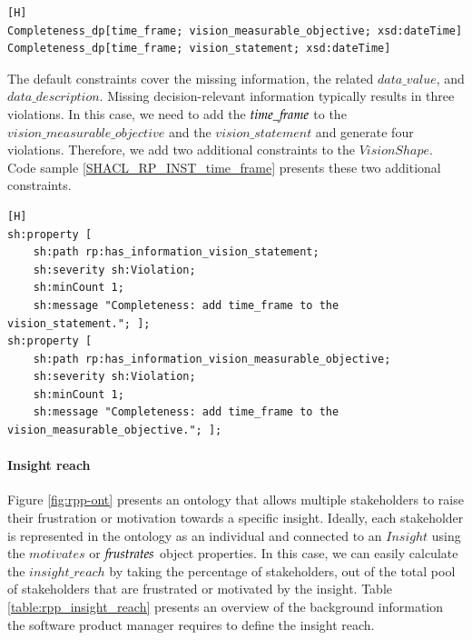 \begin{lstlisting}[float,language=GDOL,caption={The GDOL instantiation code of the time frames of the $vision\_measurable\_objective$ and the $vision\_statement$.},label={GDOP_RP_INST_Vision_Contribution_Time_Frame}][H]
Completeness_dp[time_frame; vision_measurable_objective; xsd:dateTime] 
Completeness_dp[time_frame; vision_statement; xsd:dateTime] 
\end{lstlisting}

The default constraints cover the missing information, the related $data\_value$, and $data\_description$. Missing decision-relevant information typically results in three violations. In this case, we need to add the $time\_{\mkern-2mu f\mkern-3mu}rame$ to the $vision\_measurable\_objective$ and the $vision\_statement$ and generate four violations. Therefore, we add two additional constraints to the $VisionShape$. Code sample \ref{SHACL_RP_INST_time_frame} presents these two additional constraints.

\begin{lstlisting}[float,language=SHACL,caption={The SHACL shapes that validate the completeness of the $time\_{\f}rame$ data property in the context of the vision statement and the measurable objective.},label={SHACL_RP_INST_time_frame}][H]
sh:property [
	sh:path rp:has_information_vision_statement;
	sh:severity sh:Violation; 
	sh:minCount 1; 
	sh:message "Completeness: add time_frame to the vision_statement."; ];
sh:property [
	sh:path rp:has_information_vision_measurable_objective;
	sh:severity sh:Violation; 
	sh:minCount 1; 
	sh:message "Completeness: add time_frame to the vision_measurable_objective."; ];
\end{lstlisting}

\paragraph{Insight reach}
Figure \ref{fig:rpp-ont} presents an ontology that allows multiple stakeholders to raise their frustration or motivation towards a specific insight. Ideally, each stakeholder is represented in the ontology as an individual and connected to an $Insight$ using the $motivates$ or ${\mkern-2mu f\mkern-3mu}rustrates$ object properties. In this case, we can easily calculate the $insight\_reach$ by taking the percentage of stakeholders, out of the total pool of stakeholders that are frustrated or motivated by the insight. Table \ref{table:rpp_insight_reach} presents an overview of the background information the software product manager requires to define the insight reach. 

